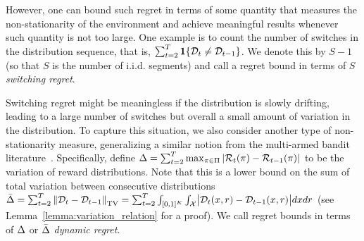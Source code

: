 However, one can bound such regret in terms of some quantity that measures the non-stationarity of the environment
and achieve meaningful results whenever such quantity is not too large.
One example is to count the number of switches in the distribution sequence,
that is, $\sum_{t=2}^T \boldsymbol{1}\{{\mathcal{D}}_t \neq {\mathcal{D}}_{t-1}\}$.
We denote this by $S - 1$ (so that $S$ is the number of i.i.d. segments)
and call a regret bound in terms of $S$ {\it switching regret}.

Switching regret might be meaningless if the distribution is slowly drifting,
leading to a large number of switches but overall a small amount of variation in the distribution.
To capture this situation, we also consider another type of non-stationarity measure,
generalizing a similar notion from the multi-armed bandit literature~\citep{BesbesGuZe14}.
Specifically, define \sloppy$\Delta = \sum_{t=2}^T \max_{\pi \in \Pi} |{\mathcal{R}}_t(\pi) - {\mathcal{R}}_{t-1}(\pi)|$
to be the variation of reward distributions.
Note that this is a lower bound on the sum of total variation between consecutive distributions
$\bvar = \sum_{t=2}^T \TVD{\calD_t-\calD_{t-1}} = \sum_{t=2}^T\int_{[0,1]^K}\int_{\calX} \bigabs{\calD_{t}(x,r)-\calD_{t-1}(x,r)} dxdr$
(see Lemma~\ref{lemma:variation_relation} for a proof).
We call regret bounds in terms of $\Delta$ or $\bar{\Delta}$ {\it dynamic regret}.


